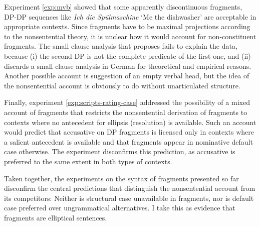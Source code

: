 Experiment \ref{exp:mvb} showed that some apparently discontinuous fragments, DP-DP sequences like \textit{Ich die Spülmaschine} `Me the dishwasher' are acceptable in appropriate contexts. Since fragments have to be maximal projections according to the nonsentential theory, it is unclear how it would account for non-constituent fragments. The small clause analysis that \citet{progovac2006} proposes fails to explain the data, because (i) the second DP is not the  complete predicate of the first one, and (ii) \citet{reich2017} discards a small clause analysis in German for theoretical and empirical reasons. Another possible account is  suggestion of an empty verbal head, but the idea of the nonsentential account is obviously to do without unarticulated structure.

Finally, experiment \ref{exp:scripts-rating-case} addressed the possibility of a mixed account of fragments that restricts the nonsentential derivation of fragments to contexts where no antecedent for ellipsis (resolution) is available. Such an account would predict that accusative on DP fragments is licensed only in contexts where a salient antecedent is available and that fragments appear in nominative default case otherwise. The experiment disconfirms this prediction, as accusative is preferred to the same extent in both types of contexts. 

Taken together, the experiments on the syntax of fragments presented so far disconfirm the central predictions that distinguish the nonsentential account from its competitors: Neither is structural case unavailable in fragments, nor is default case preferred over ungrammatical alternatives. I take this as evidence that fragments are elliptical sentences.

